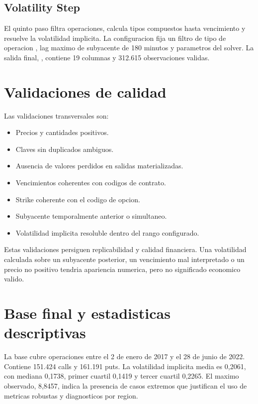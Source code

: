 \subsection{Volatility Step}

El quinto paso filtra operaciones, calcula tipos compuestos hasta vencimiento y resuelve la volatilidad implicita. La configuracion fija un filtro de tipo de operacion , lag maximo de subyacente de 180 minutos y parametros del solver. La salida final, , contiene 19 columnas y 312.615 observaciones validas.

\section{Validaciones de calidad}

Las validaciones transversales son:

\begin{itemize}
  \item Precios y cantidades positivos.
  \item Claves sin duplicados ambiguos.
  \item Ausencia de valores perdidos en salidas materializadas.
  \item Vencimientos coherentes con codigos de contrato.
  \item Strike coherente con el codigo de opcion.
  \item Subyacente temporalmente anterior o simultaneo.
  \item Volatilidad implicita resoluble dentro del rango configurado.
\end{itemize}

Estas validaciones persiguen replicabilidad y calidad financiera. Una volatilidad calculada sobre un subyacente posterior, un vencimiento mal interpretado o un precio no positivo tendria apariencia numerica, pero no significado economico valido.

\section{Base final y estadisticas descriptivas}

La base  cubre operaciones entre el 2 de enero de 2017 y el 28 de junio de 2022. Contiene 151.424 calls y 161.191 puts. La volatilidad implicita media es 0,2061, con mediana 0,1738, primer cuartil 0,1419 y tercer cuartil 0,2265. El maximo observado, 8,8457, indica la presencia de casos extremos que justifican el uso de metricas robustas y diagnosticos por region.

